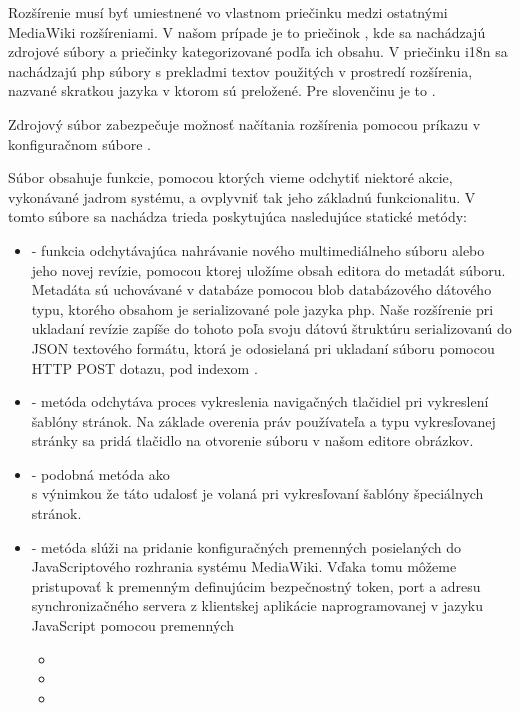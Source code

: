 Rozšírenie musí byť umiestnené vo vlastnom priečinku medzi ostatnými MediaWiki rozšíreniami. V našom prípade je to priečinok , kde sa nachádzajú zdrojové súbory a priečinky kategorizované podľa ich obsahu. V priečinku i18n sa nachádzajú php súbory s prekladmi textov použitých v prostredí rozšírenia, nazvané skratkou jazyka v ktorom sú preložené. Pre slovenčinu je to .

Zdrojový súbor  zabezpečuje možnosť načítania rozšírenia pomocou príkazu  v konfiguračnom súbore .

Súbor  obsahuje funkcie, pomocou ktorých vieme odchytiť niektoré akcie, vykonávané jadrom systému, a ovplyvniť tak jeho základnú funkcionalitu. V tomto súbore sa nachádza trieda  poskytujúca nasledujúce statické metódy:

\begin{itemize}
	\item {} - funkcia odchytávajúca nahrávanie nového multimediálneho súboru alebo jeho novej revízie, pomocou ktorej uložíme obsah editora do metadát súboru. Metadáta sú uchovávané v databáze pomocou blob databázového dátového typu, ktorého obsahom je serializované pole jazyka php. Naše rozšírenie pri ukladaní revízie zapíše do tohoto poľa svoju dátovú štruktúru serializovanú do JSON textového formátu, ktorá je odosielaná pri ukladaní súboru pomocou HTTP POST dotazu, pod indexom .
	
	\item {} - metóda odchytáva proces vykreslenia navigačných tlačidiel pri vykreslení šablóny stránok. Na základe overenia práv používateľa a typu vykresľovanej stránky sa pridá tlačidlo na otvorenie súboru v našom editore obrázkov.
	
	\item {} - podobná metóda ako \\
	 s výnimkou že táto udalosť je volaná pri vykresľovaní šablóny špeciálnych stránok.
	
	\item {} - metóda slúži na pridanie konfiguračných premenných posielaných do JavaScriptového rozhrania systému MediaWiki. Vďaka tomu môžeme pristupovať k premenným definujúcim bezpečnostný token, port a adresu synchronizačného servera z klientskej aplikácie naprogramovanej v jazyku JavaScript pomocou premenných 
	\begin{itemize}
		\item {}
		\item {}
		\item {}
	\end{itemize}
\end{itemize}

